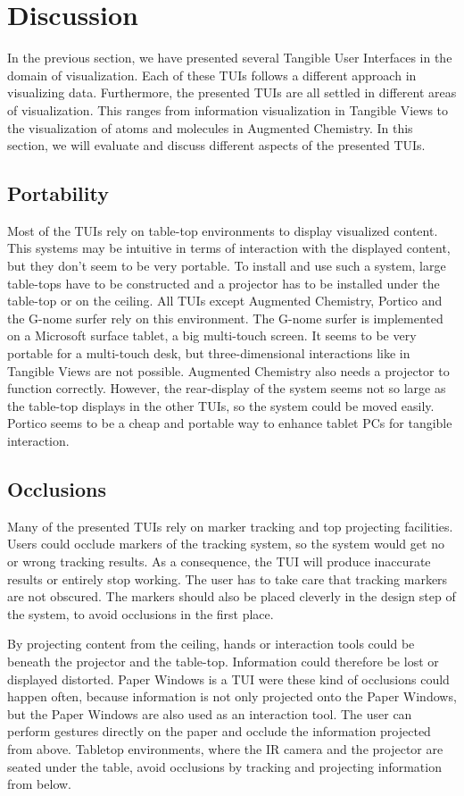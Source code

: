 \section{Discussion}
In the previous section, we have presented several Tangible User Interfaces in the domain of visualization. Each of these TUIs follows a different approach in visualizing data. Furthermore, the presented TUIs are all settled in different areas of visualization. This ranges from information visualization in Tangible Views to the visualization of atoms and molecules in Augmented Chemistry. In this section, we will evaluate and discuss different aspects of the presented TUIs.

\subsection{Portability}
Most of the TUIs rely on table-top environments to display visualized content. This systems may be intuitive in terms of interaction with the displayed content, but they don't seem to be very portable. To install and use such a system, large table-tops have to be constructed and a projector has to be installed under the table-top or on the ceiling. All TUIs except Augmented Chemistry, Portico and the G-nome surfer rely on this environment. The G-nome surfer is implemented on a Microsoft surface tablet, a big multi-touch screen. It seems to be very portable for a multi-touch desk, but three-dimensional interactions like in Tangible Views are not possible. Augmented Chemistry also needs a projector to function correctly. However, the rear-display of the system seems not so large as the table-top displays in the other TUIs, so the system could be moved easily. Portico seems to be a cheap and portable way to enhance tablet PCs for tangible interaction. 

\subsection{Occlusions}
Many of the presented TUIs rely on marker tracking and top projecting facilities. Users could occlude markers of the tracking system, so the system would get no or wrong tracking results. As a consequence, the TUI will produce inaccurate results or entirely stop working. The user has to take care that tracking markers are not obscured. The markers should also be placed cleverly in the design step of the system, to avoid occlusions in the first place. 

By projecting content from the ceiling, hands or interaction tools could be beneath the projector and the table-top. Information could therefore be lost or displayed distorted. Paper Windows is a TUI were these kind of occlusions could happen often, because information is not only projected onto the Paper Windows, but the Paper Windows are also used as an interaction tool. The user can perform gestures directly on the paper and occlude the information projected from above. Tabletop environments, where the IR camera and the projector are seated under the table, avoid occlusions by tracking and projecting information from below. 

